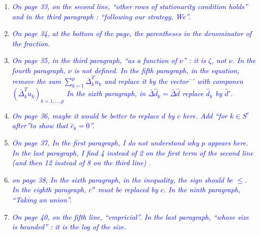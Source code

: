\documentclass[pdftex,12pt]{article}
\let\hat\widehat
\def\rc#1{{\it\textcolor{blue}{#1}}\smallskip}
\begin{document}
\begin{enumerate}
\item \rc{On page 33, on the second line, ``other rows of stationarity
condition holds'' and in the third paragraph : ``following our strategy, We''.}
\item \rc{On page 34, at the bottom of the page, the parentheses in the
denominator of the fraction.}
\item \rc{On page 35, in the third paragraph, ``as a function of $\nu$'' : it is
$\zeta$, not $\nu$. In the fourth paragraph, $\nu$ is not defined. In the fifth
paragraph, in the equation, remove the sum $\sum_{k=1}^p
\bar\Delta_k^T u_k$  and replace
it by the vector ̄ˆ with componen$(\bar\Delta_k^T u_k)_{k=1,\ldots, p}$ In the sixth paragraph,
in $\bar\Delta \hat d_k = \bar\Delta\hat d$ replace $\hat d_k$ by
$\hat d'$.}
\item \rc{On page 36, maybe it would be better to replace $d$ by $c$ here. Add
``for $k\in S^c$ after''to show that $\hat c_k =0$''.}
\item \rc{On page 37, In the first paragraph, I do not understand why $p$ appears
here. In the last paragraph, I find 4 instead of 2 on the first term of
the second line (and then 12 instead of 8 on the third line) .}
\item \rc{on page 38, In the sixth paragraph, in the inequality, the sign
should be $\leq$. In the eighth paragraph, $c''$ must be replaced by $c$. In
the ninth paragraph, ``Taking an union''.}
\item \rc{On page 40, on the fifth line, ``empricial''. In the last paragraph,
``whose size is bounded'' : it is the log of the size.}


\end{enumerate}
\end{document}
